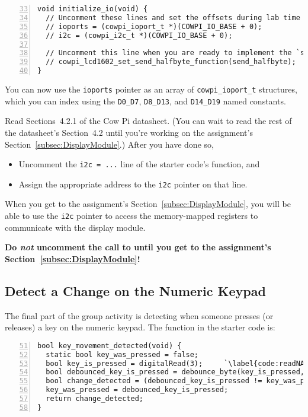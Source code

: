 \begin{lstlisting}[numberstyle=\color{gray}, numbers=left, firstnumber=33]
void initialize_io(void) {
  // Uncomment these lines and set the offsets during lab time
  // ioports = (cowpi_ioport_t *)(COWPI_IO_BASE + 0);
  // i2c = (cowpi_i2c_t *)(COWPI_IO_BASE + 0);

  // Uncomment this line when you are ready to implement the `send_halfbyte()` function
  // cowpi_lcd1602_set_send_halfbyte_function(send_halfbyte);
}
\end{lstlisting}

You can now use the \lstinline{ioports} pointer as an array of \lstinline{cowpi_ioport_t} structures, which you can index using the \lstinline{D0_D7}, \lstinline{D8_D13}, and \lstinline{D14_D19} named constants.

Read Sections~4.2.1 of the Cow Pi datasheet.
(You can wait to read the rest of the datasheet's Section~4.2 until you're working on the assignment's Section~\ref{subsec:DisplayModule}.)
After you have done so,
\begin{itemize}
    \item Uncomment the \lstinline{i2c = ...} line of the starter code's  function, and
    \item Assign the appropriate address to the \lstinline{i2c} pointer on that line.
\end{itemize}

When you get to the assignment's Section~\ref{subsec:DisplayModule}, you will be able to use the \lstinline{i2c} pointer to access the memory-mapped registers to communicate with the display module.

\textbf{Do \textit{not} uncomment the call to  until you get to the assignment's Section~\ref{subsec:DisplayModule}!}


\subsection{Detect a Change on the Numeric Keypad} \label{subsec:detectKeyAction}

The final part of the group activity is detecting when someone presses (or releases) a key on the numeric keypad.
The  function in the starter code is:

\begin{lstlisting}[numberstyle=\color{gray}, numbers=left, firstnumber=51, escapechar=`]
bool key_movement_detected(void) {
  static bool key_was_pressed = false;
  bool key_is_pressed = digitalRead(3);     `\label{code:readNAND}`
  bool debounced_key_is_pressed = debounce_byte(key_is_pressed, KEYPAD);
  bool change_detected = (debounced_key_is_pressed != key_was_pressed);
  key_was_pressed = debounced_key_is_pressed;
  return change_detected;
}
\end{lstlisting}

